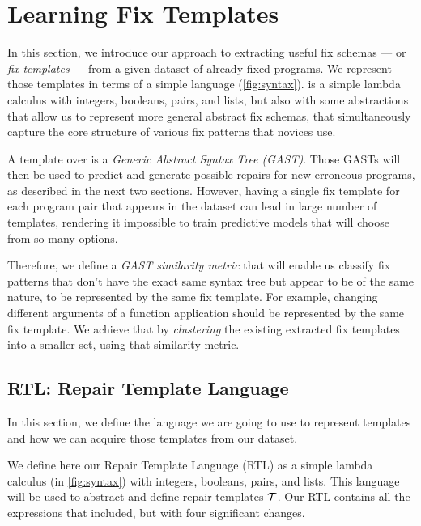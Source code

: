 \section{Learning Fix Templates}
\label{sec:templ-cluster}

In this section, we introduce our approach to extracting useful fix schemas ---
or \emph{fix templates} --- from a given dataset of already fixed programs. We
represent those templates in terms of a simple language \repairLang
(\autoref{fig:syntax}). \repairLang is a simple lambda calculus with integers,
booleans, pairs, and lists, but also with some abstractions that allow us to
represent more general abstract fix schemas, that simultaneously capture the
core structure of various fix patterns that novices use.

A template over \repairLang is a \emph{Generic Abstract Syntax Tree (GAST)}.
Those GASTs will then be used to predict and generate possible repairs for new
erroneous programs, as described in the next two sections. However, having a
single fix template for each program pair that appears in the dataset can lead
in large number of templates, rendering it impossible to train predictive models
that will choose from so many options.

Therefore, we define a \emph{GAST similarity metric} that will enable us
classify fix patterns that don't have the exact same syntax tree but appear to
be of the same nature, to be represented by the same fix template. For example,
changing different arguments of a function application should be represented by
the same fix template. We achieve that by \emph{clustering} the existing
extracted fix templates into a smaller set, using that similarity metric.


\subsection{RTL: Repair Template Language}
\label{subsec:lang}

In this section, we define the language we are going to use to represent
templates and how we can acquire those templates from our dataset.

We define here our Repair Template Language (RTL) as a simple lambda calculus
(\repairLang in \autoref{fig:syntax}) with integers, booleans, pairs, and lists.
This language will be used to abstract and define repair templates $\mathcal{T}$. Our RTL
contains all the expressions that \lang included, but with four significant
changes.

